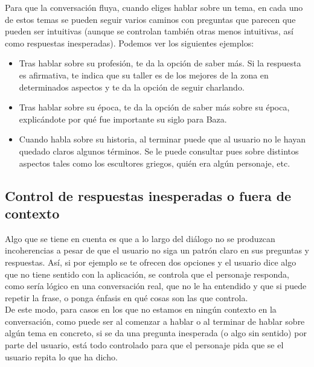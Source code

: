 Para que la conversación fluya, cuando eliges hablar sobre un tema, en cada uno de estos temas se pueden seguir varios caminos con preguntas que parecen que pueden ser intuitivas (aunque se controlan también otras menos intuitivas, así como respuestas inesperadas). Podemos ver los siguientes ejemplos:

\begin{itemize}
	\item Tras hablar sobre su profesión, te da la opción de saber más. Si la respuesta es afirmativa, te indica que su taller es de los mejores de la zona en determinados aspectos y te da la opción de seguir charlando.
	
	\item Tras hablar sobre su época, te da la opción de saber más sobre su época, explicándote por qué fue importante su siglo para Baza.
	
	\item Cuando habla sobre su historia, al terminar puede que al usuario no le hayan quedado claros algunos términos. Se le puede consultar pues sobre distintos aspectos tales como los escultores griegos, quién era algún personaje, etc.
	
\end{itemize}

\subsection*{Control de respuestas inesperadas o fuera de contexto}

Algo que se tiene en cuenta es que a lo largo del diálogo no se produzcan incoherencias a pesar de que el usuario no siga un patrón claro en sus preguntas y respuestas. Así, si por ejemplo se te ofrecen dos opciones y el usuario dice algo que no tiene sentido con la aplicación, se controla que el personaje responda, como sería lógico en una conversación real, que no le ha entendido y que si puede repetir la frase, o ponga énfasis en qué cosas son las que controla.\\ 

De este modo, para casos en los que no estamos en ningún contexto en la conversación, como puede ser al comenzar a hablar o al terminar de hablar sobre algún tema en concreto, si se da una pregunta inesperada (o algo sin sentido) por parte del usuario, está todo controlado para que el personaje pida que se el usuario repita lo que ha dicho. \\

